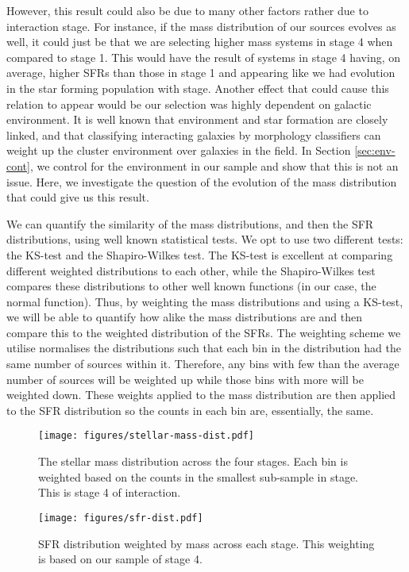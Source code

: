 \documentclass[fleqn,usenatbib]{mnras}
\begin{document}
However, this result could also be due to many other factors rather due to interaction stage. For instance, if the mass distribution of our sources evolves as well, it could just be that we are selecting higher mass systems in stage 4 when compared to stage 1. This would have the result of systems in stage 4 having, on average, higher SFRs than those in stage 1 and appearing like we had evolution in the star forming population with stage. Another effect that could cause this relation to appear would be our selection was highly dependent on galactic environment. It is well known that environment and star formation are closely linked, and that classifying interacting galaxies by morphology classifiers can weight up the cluster environment over galaxies in the field. In Section \ref{sec:env-cont}, we control for the environment in our sample and show that this is not an issue. Here, we investigate the question of the evolution of the mass distribution that could give us this result.

We can quantify the similarity of the mass distributions, and then the SFR distributions, using well known statistical tests. We opt to use two different tests: the KS-test and the Shapiro-Wilkes test. The KS-test is excellent at comparing different weighted distributions to each other, while the Shapiro-Wilkes test compares these distributions to other well known functions (in our case, the normal function). Thus, by weighting the mass distributions and using a KS-test, we will be able to quantify how alike the mass distributions are and then compare this to the weighted distribution of the SFRs. The weighting scheme we utilise normalises the distributions such that each bin in the distribution had the same number of sources within it. Therefore, any bins with few than the average number of sources will be weighted up while those bins with more will be weighted down. These weights applied to the mass distribution are then applied to the SFR distribution so the counts in each bin are, essentially, the same.

\begin{figure}
    \centering
    \texttt{[image: figures/stellar-mass-dist.pdf]}
    \caption{The stellar mass distribution across the four stages. Each bin is weighted based on the counts in the smallest sub-sample in stage. This is stage 4 of interaction.}
    \label{fig:weighted-mass}
\end{figure}

\begin{figure}
    \centering
    \texttt{[image: figures/sfr-dist.pdf]}
    \caption{SFR distribution weighted by mass across each stage. This weighting is based on our sample of stage 4.}
    \label{fig:weighted-sfr}
\end{figure}
\end{document}
